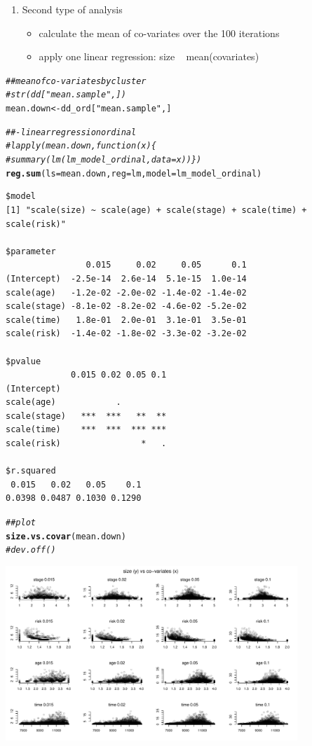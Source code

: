 \documentclass[]{revtex4}\usepackage[]{graphicx}\usepackage[]{color}
\makeatletter
\newcommand{\hlstr}[1]{\textcolor[rgb]{0.192,0.494,0.8}{#1}}%
\newcommand{\hlcom}[1]{\textcolor[rgb]{0.678,0.584,0.686}{\textit{#1}}}%
\newcommand{\hlstd}[1]{\textcolor[rgb]{0.345,0.345,0.345}{#1}}%
\newcommand{\hlkwb}[1]{\textcolor[rgb]{0.69,0.353,0.396}{#1}}%
\newcommand{\hlkwc}[1]{\textcolor[rgb]{0.333,0.667,0.333}{#1}}%
\newcommand{\hlkwd}[1]{\textcolor[rgb]{0.737,0.353,0.396}{\textbf{#1}}}%
\newenvironment{kframe}{%
 \def\at@end@of@kframe{}%
 \ifinner\ifhmode%
  \def\at@end@of@kframe{\end{minipage}}%
  \begin{minipage}{\columnwidth}%
 \fi\fi%
 \def\FrameCommand##1{\hskip\@totalleftmargin \hskip-\fboxsep
 \colorbox{shadecolor}{##1}\hskip-\fboxsep
     \hskip-\linewidth \hskip-\@totalleftmargin \hskip\columnwidth}%
 \MakeFramed {\advance\hsize-\width
   \@totalleftmargin\z@ \linewidth\hsize
   \@setminipage}}%
 {\par\unskip\endMakeFramed%
 \at@end@of@kframe}
\newenvironment{knitrout}{}{} %
\makeatother
\begin{document}
\begin{itemize}
\begin{enumerate}
\item Second type of analysis
      \begin{itemize}
      \item calculate the mean of co-variates over the 100 iterations
      \item apply one linear regression: size ~ mean(covariates)
      \end{itemize}
    \end{enumerate}
\end{itemize}

\begin{knitrout}
\color{fgcolor}\begin{kframe}
\begin{alltt}
  \hlcom{## mean of co-variates by cluster}
  \hlcom{# str(dd["mean.sample",])}
  \hlstd{mean.down} \hlkwb{<-} \hlstd{dd_ord[}\hlstr{"mean.sample"}\hlstd{,]}

  \hlcom{##- linear regression ordinal}
\hlcom{#    lapply(mean.down, function(x) \{}
\hlcom{#    summary(lm(lm_model_ordinal, data = x))\})}
  \hlkwd{reg.sum}\hlstd{(}\hlkwc{ls} \hlstd{= mean.down,} \hlkwc{reg} \hlstd{= lm,} \hlkwc{model} \hlstd{= lm_model_ordinal)}
\end{alltt}
\begin{verbatim}
$model
[1] "scale(size) ~ scale(age) + scale(stage) + scale(time) + scale(risk)"

$parameter
                0.015     0.02     0.05      0.1
(Intercept)  -2.5e-14  2.6e-14  5.1e-15  1.0e-14
scale(age)   -1.2e-02 -2.0e-02 -1.4e-02 -1.4e-02
scale(stage) -8.1e-02 -8.2e-02 -4.6e-02 -5.2e-02
scale(time)   1.8e-01  2.0e-01  3.1e-01  3.5e-01
scale(risk)  -1.4e-02 -1.8e-02 -3.3e-02 -3.2e-02

$pvalue
             0.015 0.02 0.05 0.1
(Intercept)                     
scale(age)            .         
scale(stage)   ***  ***   **  **
scale(time)    ***  ***  *** ***
scale(risk)                *   .

$r.squared
 0.015   0.02   0.05    0.1 
0.0398 0.0487 0.1030 0.1290 
\end{verbatim}
\begin{alltt}
  \hlcom{## plot}
  \hlkwd{size.vs.covar}\hlstd{(mean.down)}
  \hlcom{# dev.off()}
\end{alltt}
\end{kframe}

{\centering \includegraphics[width=11cm]{figure/plotrun_down-sample_2-1} 

}
\end{knitrout}
\end{document}
